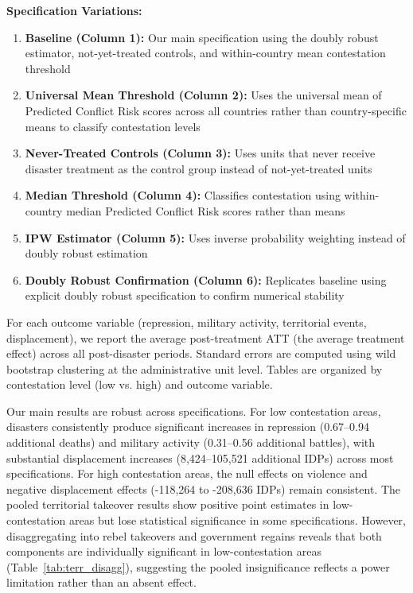 \documentclass[bibtex]{article}
\begin{document}
{\noindent \textbf{Specification Variations:}

\begin{enumerate}
\item \textbf{Baseline (Column 1):} Our main specification using the doubly robust estimator, not-yet-treated controls, and within-country mean contestation threshold
\item \textbf{Universal Mean Threshold (Column 2):} Uses the universal mean of Predicted Conflict Risk scores across all countries rather than country-specific means to classify contestation levels
\item \textbf{Never-Treated Controls (Column 3):} Uses units that never receive disaster treatment as the control group instead of not-yet-treated units
\item \textbf{Median Threshold (Column 4):} Classifies contestation using within-country median Predicted Conflict Risk scores rather than means
\item \textbf{IPW Estimator (Column 5):} Uses inverse probability weighting instead of doubly robust estimation
\item \textbf{Doubly Robust Confirmation (Column 6):} Replicates baseline using explicit doubly robust specification to confirm numerical stability
\end{enumerate}

For each outcome variable (repression, military activity, territorial events, displacement), we report the average post-treatment ATT (the average treatment effect) across all post-disaster periods. Standard errors are computed using wild bootstrap clustering at the administrative unit level. Tables are organized by contestation level (low vs. high) and outcome variable.

Our main results are robust across specifications. For low contestation areas, disasters consistently produce significant increases in repression (0.67–0.94 additional deaths) and military activity (0.31–0.56 additional battles), with substantial displacement increases (8,424–105,521 additional IDPs) across most specifications. For high contestation areas, the null effects on violence and negative displacement effects (-118,264 to -208,636 IDPs) remain consistent. {\color{black} The pooled territorial takeover results show positive point estimates in low-contestation areas but lose statistical significance in some specifications. However, disaggregating into rebel takeovers and government regains reveals that both components are individually significant in low-contestation areas (Table~\ref{tab:terr_disagg}), suggesting the pooled insignificance reflects a power limitation rather than an absent effect.}



}
\end{document}
